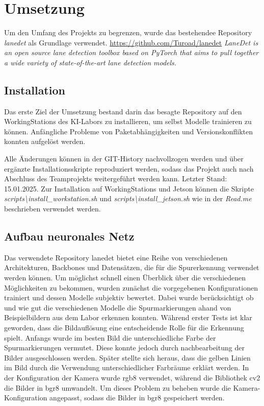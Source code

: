 \documentclass{article}
\begin{document}
    \section{Umsetzung}
        Um den Umfang des Projekts zu begrenzen, wurde das bestehendee Repository \textit{lanedet} als Grundlage verwendet.
        \url{https://github.com/Turoad/lanedet}
        \textit{LaneDet is an open source lane detection toolbox based on PyTorch that aims to pull together a wide variety of state-of-the-art lane detection models.}

        \subsection{Installation}
            Das erste Ziel der Umsetzung bestand darin das besagte Repository auf den WorkingStations des KI-Labors zu installieren, um selbst Modelle trainieren zu können.
            Anfängliche Probleme von Paketabhängigkeiten und Versionskonflikten konnten aufgelöst werden. 

            Alle Änderungen können in der GIT-History nachvollzogen werden und über ergänzte Installationsskripte reproduziert werden, sodass das Projekt auch nach Abschluss des Teamprojekts weitergeführt werden kann. Letzter Stand: 15.01.2025. %
            Zur Installation auf WorkingStations und Jetson können die Skripte \textit{scripts\textbackslash install\_workstation.sh} und \textit{scripts\textbackslash install\_jetson.sh} wie in der \textit{Read.me} beschrieben verwendet werden.

        \subsection{Aufbau neuronales Netz}
            Das verwendete Repository lanedet bietet eine Reihe von verschiedenen Architekturen, Backbones und Datensätzen, die für die Spurerkennung verwendet werden können.
            Um möglichst schnell einen Überblick über die verschiedenen Möglichkeiten zu bekommen, wurden zunächst die vorgegebenen Konfigurationen trainiert und dessen Modelle subjektiv bewertet.
            Dabei wurde berücksichtigt ob und wie gut die verschiedenen Modelle die Spurmarkierungen ahand von Beispielbildern aus dem Labor erkennen konnten.
            Während erster Tests ist klar geworden, dass die Bildauflösung eine entscheidende Rolle für die Erkennung spielt. Anfangs wurde im besten Bild die unterschiedliche Farbe der Spurmarkierungen vermutet. Diese konnte jedoch durch nachbearbeitung der Bilder ausgeschlossen werden. Später stellte sich heraus, dass die gelben Linien im Bild durch die Verwendung unterschiedlicher Farbräume erklärt werden. In der Konfiguration der Kamera wurde rgb8 verwendet, während die Bibliothek cv2 die Bilder in bgr8 umwandelt. Um dieses Problem zu beheben wurde die Kamera-Konfiguration angepasst, sodass die Bilder in bgr8 gespeichert werden.
\end{document}

